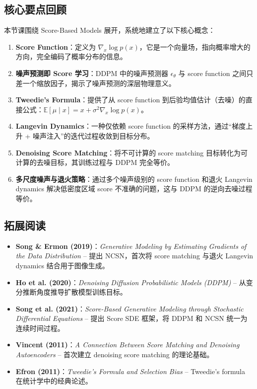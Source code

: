 \documentclass[a4paper]{article}
\begin{document}
\subsection{核心要点回顾}

本节课围绕 Score-Based Models 展开，系统地建立了以下核心概念：

\begin{enumerate}
    \item \textbf{Score Function}：定义为 $\nabla_x \log p(x)$，它是一个向量场，指向概率增大的方向，完全编码了概率分布的信息。

    \item \textbf{噪声预测即 Score 学习}：DDPM 中的噪声预测器 $\epsilon_\theta$ 与 score function 之间只差一个缩放因子，揭示了噪声预测的深层物理意义。

    \item \textbf{Tweedie's Formula}：提供了从 score function 到后验均值估计（去噪）的直接公式：$\mathbb{E}[\mu \mid x] = x + \sigma^2 \nabla_x \log p(x)$。

    \item \textbf{Langevin Dynamics}：一种仅依赖 score function 的采样方法，通过``梯度上升 + 噪声注入''的迭代过程收敛到目标分布。

    \item \textbf{Denoising Score Matching}：将不可计算的 score matching 目标转化为可计算的去噪目标，其训练过程与 DDPM 完全等价。

    \item \textbf{多尺度噪声与退火策略}：通过多个噪声级别的 score function 和退火 Langevin dynamics 解决低密度区域 score 不准确的问题，这与 DDPM 的逆向去噪过程等价。
\end{enumerate}

\subsection{拓展阅读}

\begin{itemize}
    \item \textbf{Song \& Ermon (2019)}：\textit{Generative Modeling by Estimating Gradients of the Data Distribution} -- 提出 NCSN，首次将 score matching 与退火 Langevin dynamics 结合用于图像生成。
    \item \textbf{Ho et al. (2020)}：\textit{Denoising Diffusion Probabilistic Models (DDPM)} -- 从变分推断角度推导扩散模型训练目标。
    \item \textbf{Song et al. (2021)}：\textit{Score-Based Generative Modeling through Stochastic Differential Equations} -- 提出 Score SDE 框架，将 DDPM 和 NCSN 统一为连续时间过程。
    \item \textbf{Vincent (2011)}：\textit{A Connection Between Score Matching and Denoising Autoencoders} -- 首次建立 denoising score matching 的理论基础。
    \item \textbf{Efron (2011)}：\textit{Tweedie's Formula and Selection Bias} -- Tweedie's formula 在统计学中的经典论述。
\end{itemize}

\end{document}
